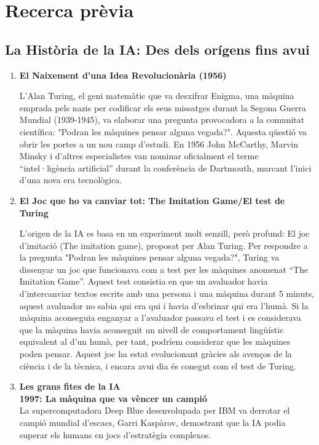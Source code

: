\chapter{Recerca prèvia}
\label{c:recerca prèvia}

\section{La Història de la IA: Des dels orígens fins avui}
\begin{enumerate}
    \item \textbf{El Naixement d'una Idea Revolucionària (1956)}

    L'Alan Turing, el geni matemàtic que va desxifrar Enigma, una màquina emprada pels nazis per codificar els seus missatges durant la Segona Guerra Mundial (1939-1945), va elaborar una pregunta provocadora a la comunitat científica: "Podran les màquines pensar alguna vegada?". Aquesta qüestió va obrir les portes a un nou camp d'estudi. En 1956 John McCarthy, Marvin Minsky i d'altres especialistes van nominar oficialment el terme ``intel·ligència artificial'' durant la conferència de Dartmouth, marcant l'inici d'una nova era tecnològica.

    \item \textbf{El Joc que ho va canviar tot: The Imitation Game/El test de Turing}

    L'origen de la IA es basa en un experiment molt senzill, però profund: El joc d'imitació (The imitation game), proposat per Alan Turing. Per respondre a la pregunta "Podran les màquines pensar alguna vegada?", Turing va dissenyar un joc que funcionava com a test per les màquines anomenat ``The Imitation Game''. Aquest test consistia en que un avaluador havia d'intercanviar textos escrits amb una persona i una màquina durant 5 minuts, aquest avaluador no sabia qui era qui i havia d'esbrinar qui era l'humà. Si la màquina aconseguia enganyar a l'avaluador passava el test i es considerava que la màquina havia aconseguit un nivell de comportament lingüístic equivalent al d'un humà, per tant, podríem considerar que les màquines poden pensar. Aquest joc ha estat evolucionant gràcies als avenços de la ciència i de la tècnica, i encara avui dia és conegut com el test de Turing.
\clearpage
    \item \textbf{Les grans fites de la IA}\\
    \textbf{1997: La màquina que va vèncer un campió}\\
    La supercomputadora Deep Blue desenvolupada per IBM va derrotar el campió mundial d'escacs, Garri Kaspàrov, demostrant que la IA podia superar els humans en jocs d'estratègia complexos.


\end{enumerate}
